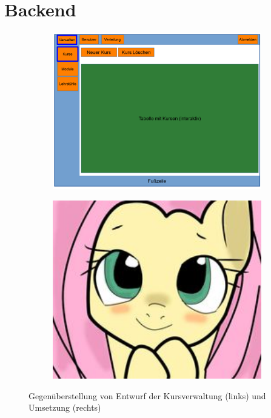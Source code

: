     
    \section{Backend}
        \begin{figure}
            \centering
            \begin{subfigure}{0.49\textwidth}
                \includegraphics[width=1.0\textwidth]{./implementation/images/MockUpsBackend/backendManageCourses.png}
            \end{subfigure}
            \begin{subfigure}{0.49\textwidth}
                \includegraphics[width=1.0\textwidth]{./implementation/images/dummy.jpg}
            \end{subfigure}
            \caption{Gegenüberstellung von Entwurf der Kursverwaltung (links) und Umsetzung (rechts)}
            \label{fig:comparisonManageCourses}
        \end{figure}
        
